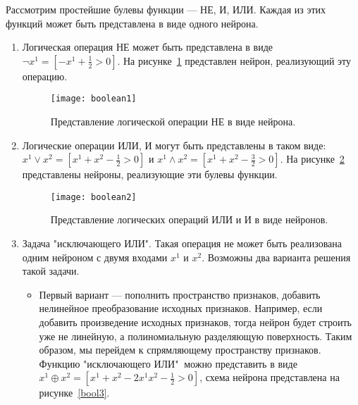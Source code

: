 \documentclass[specialist, 12pt, 
subf, %
href, colorlinks=true,
substylefile = spbu.rtx,
]{disser}
\begin{document}
	Рассмотрим простейшие булевы функции --- НЕ, И, ИЛИ. Каждая из этих функций может быть представлена в виде одного нейрона. 
	\begin{enumerate}
		\item Логическая операция НЕ может быть представлена в виде $\lnot x^1 = [-x^1+\frac{1}{2}>0]$. На рисунке~\ref{bool1} представлен нейрон, реализующий эту операцию.
		\begin{figure}[h]
			\begin{center}
				\begin{minipage}{0.5\linewidth}
					\texttt{[image: boolean1]}
					\caption{Представление логической операции НЕ в виде нейрона.}
					\label{bool1}
				\end{minipage}
			\end{center}
		\end{figure}
		\item Логические операции ИЛИ, И могут быть представлены в таком виде: $x^1 \lor x^2 = [x^1+x^2 -\frac{1}{2}>0]$ и $x^1 \wedge x^2 = [x^1+x^2 -\frac{3}{2}>0]$. На рисунке~\ref{bool2} представлены нейроны, реализующие эти булевы функции.
		\begin{figure}[h]
			\begin{center}
				\begin{minipage}{0.85\linewidth}
					\texttt{[image: boolean2]}
					\caption{Представление логических операций ИЛИ и И в виде нейронов.}
					\label{bool2}
				\end{minipage}
			\end{center}
		\end{figure}
	   
	   \item Задача "исключающего ИЛИ". Такая операция не может быть реализована одним нейроном с двумя входами $x^1$ и $x^2$. Возможны два варианта решения такой задачи. 
	   
	   \begin{itemize}
	 \item  Первый вариант --- пополнить пространство признаков, добавить нелинейное преобразование исходных признаков. Например, если добавить произведение исходных признаков, тогда нейрон будет строить уже не линейную, а полиномиальную разделяющую поверхность. Таким образом, мы перейдем к спрямляющему пространству признаков. Функцию "исключающего ИЛИ"$~$ можно представить в виде $x^1 \oplus x^2 = [x^1+x^2 -2x^1x^2-\frac{1}{2}>0]$, схема нейрона представлена на рисунке~\ref{bool3}.
	   

\end{itemize}
\end{enumerate}
\end{document}
